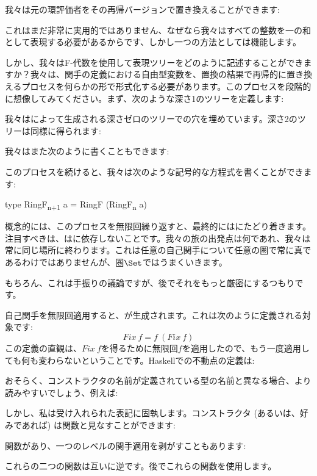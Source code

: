 我々は元の環評価者をその再帰バージョンで置き換えることができます: 

これはまだ非常に実用的ではありません、なぜなら我々はすべての整数を一の和として表現する必要があるからです、しかし一つの方法としては機能します。

しかし、我々はF-代数を使用して表現ツリーをどのように記述することができますか？我々は、関手の定義における自由型変数を、置換の結果で再帰的に置き換えるプロセスを何らかの形で形式化する必要があります。このプロセスを段階的に想像してみてください。まず、次のような深さ1のツリーを定義します: 

我々はによって生成される深さゼロのツリーでの穴を埋めています。深さ2のツリーは同様に得られます: 

我々はまた次のように書くこともできます: 

このプロセスを続けると、我々は次のような記号的な方程式を書くことができます: 

\begin{snipv}
type RingF\textsubscript{n+1} a = RingF (RingF\textsubscript{n} a)
\end{snipv}
概念的には、このプロセスを無限回繰り返すと、最終的にはにたどり着きます。注目すべきは、はに依存しないことです。我々の旅の出発点は何であれ、我々は常に同じ場所に終わります。これは任意の自己関手について任意の圏で常に真であるわけではありませんが、圏$\Set$ではうまくいきます。

もちろん、これは手振りの議論ですが、後でそれをもっと厳密にするつもりです。

自己関手を無限回適用すると、が生成されます。これは次のように定義される対象です: 
\[\mathit{Fix}\ f = f\ (\mathit{Fix}\ f)\]
この定義の直観は、$\mathit{Fix}\ f$を得るために無限回$f$を適用したので、もう一度適用しても何も変わらないということです。Haskellでの不動点の定義は: 

おそらく、コンストラクタの名前が定義されている型の名前と異なる場合、より読みやすいでしょう、例えば: 

しかし、私は受け入れられた表記に固執します。コンストラクタ (あるいは、好みであれば) は関数と見なすことができます: 

関数があり、一つのレベルの関手適用を剥がすこともあります: 

これらの二つの関数は互いに逆です。後でこれらの関数を使用します。

